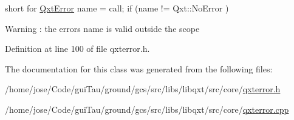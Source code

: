 short for \hyperlink{class_qxt_error}{Qxt\-Error} name = call; if (name != Qxt\-::\-No\-Error )

\begin{DoxyWarning}{Warning}
\-: the errors name is valid outside the scope 
\end{DoxyWarning}


Definition at line 100 of file qxterror.\-h.



The documentation for this class was generated from the following files\-:\begin{DoxyCompactItemize}
\item 
/home/jose/\-Code/gui\-Tau/ground/gcs/src/libs/libqxt/src/core/\hyperlink{qxterror_8h}{qxterror.\-h}\item 
/home/jose/\-Code/gui\-Tau/ground/gcs/src/libs/libqxt/src/core/\hyperlink{qxterror_8cpp}{qxterror.\-cpp}\end{DoxyCompactItemize}
